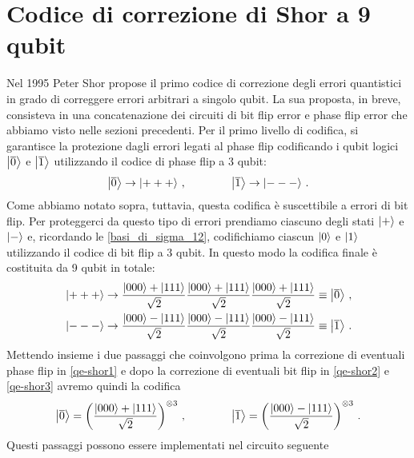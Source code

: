 \vspace{1cm}
\noindent {}

\section{Codice di correzione di Shor a 9 qubit}
Nel 1995 Peter Shor propose il primo codice di correzione degli errori quantistici in grado di correggere errori arbitrari a singolo qubit. La sua proposta, in breve, consisteva in una concatenazione dei circuiti di bit flip error e phase flip error che abbiamo visto nelle sezioni precedenti. Per il primo livello di codifica, si garantisce la protezione dagli errori legati al phase flip codificando i qubit logici $\ket{\overline 0}$ e $\ket{\overline 1}$ utilizzando il codice di phase flip a 3 qubit:
\begin{equation}\label{qe-shor1}
    \ket{\overline 0} \rightarrow \ket{+++} \, , \qquad \qquad \ket{\overline 1} \rightarrow \ket{---} \, .
\end{equation}
Come abbiamo notato sopra, tuttavia, questa codifica è suscettibile a errori di bit flip. Per proteggerci da questo tipo di errori prendiamo ciascuno degli stati $\ket +$ e $\ket -$ e, ricordando le \eqref{basi_di_sigma_12}, codifichiamo ciascun $\ket{0}$ e $\ket{1}$ utilizzando il codice di bit flip a 3 qubit. In questo modo la codifica finale è costituita da 9 qubit in totale:
\begin{align}
    &\ket{+++} \rightarrow \frac{\ket{000}+\ket{111}}{\sqrt 2}\frac{\ket{000}+\ket{111}}{\sqrt 2}\frac{\ket{000}+\ket{111}}{\sqrt 2} \equiv \ket{\overline{0}} \, , \label{qe-shor2} \\
    &\ket{---} \rightarrow \frac{\ket{000}-\ket{111}}{\sqrt 2}\frac{\ket{000}-\ket{111}}{\sqrt 2}\frac{\ket{000}-\ket{111}}{\sqrt 2} \equiv \ket{\overline{1}} \, . \label{qe-shor3}
\end{align}
Mettendo insieme i due passaggi che coinvolgono prima la correzione di eventuali phase flip in \eqref{qe-shor1} e dopo la correzione di eventuali bit flip in \eqref{qe-shor2} e \eqref{qe-shor3} avremo quindi la codifica
\begin{equation*}
    \ket{\overline 0} = \left(\frac{\ket{000}+\ket{111}}{\sqrt 2}\right)^{\otimes 3} \, , \qquad \qquad \ket{\overline 1} = \left(\frac{\ket{000}-\ket{111}}{\sqrt 2}\right)^{\otimes 3} \, .
\end{equation*}
Questi passaggi possono essere implementati nel circuito seguente
